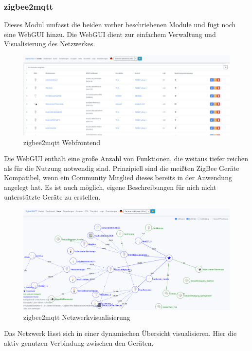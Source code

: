 \subsubsection{zigbee2mqtt}

Dieses Modul umfasst die beiden vorher beschriebenen Module und fügt noch eine WebGUI hinzu. Die WebGUI dient zur einfachem Verwaltung und Visualisierung des Netzwerkes.
\begin{figure}[H]
  \centering
  \includegraphics[width=1\textwidth]{media/z2m.png}
  \caption{zigbee2mqtt Webfrontend}
\end{figure}

Die WebGUI enthält eine große Anzahl von Funktionen, die weitaus tiefer reichen als für die Nutzung notwendig sind.
Prinzipiell sind die meißten ZigBee Geräte Kompatibel, wenn ein Community Mitglied dieses bereits in der Anwendung
angelegt hat. Es ist auch möglich, eigene Beschreibungen für nich nicht unterstützte Geräte zu erstellen.\\

\begin{figure}[H]
  \centering
  \includegraphics[width=1\textwidth]{media/z2m-map.png}
  \caption{zigbee2mqtt Netzwerkvisualisierung}
\end{figure}

Das Netzwerk lässt sich in einer dynamischen Übersicht visualisieren. Hier die aktiv genutzen Verbindung zwischen den Geräten. 



